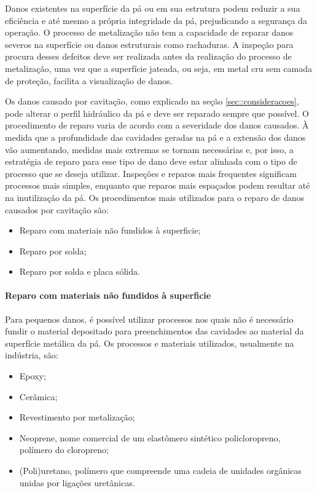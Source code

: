Danos existentes na superfície da pá ou em sua estrutura podem reduzir a sua
eficiência e até mesmo a própria integridade da pá, prejudicando a segurança 
da operação. O processo de metalização não tem a capacidade de reparar
danos severos na superfície ou danos estruturais como rachaduras. A inspeção
para procura desses defeitos deve ser realizada antes da realização do processo
de metalização, uma vez que a superfície jateada, ou seja, em metal cru sem
camada de proteção, facilita a visualização de danos. %

Os danos causado por cavitação, como explicado na seção
\ref{sec::consideracoes}, pode alterar o perfil hidráulico da pá e deve ser
reparado sempre que possível. O procedimento de reparo varia de acordo com a
severidade dos danos causados. À medida que a profundidade das cavidades geradas
na pá e a extensão dos danos vão aumentando, medidas mais extremas se tornam
necessárias e, por isso, a estratégia de reparo para esse tipo de dano deve
estar alinhada com o tipo de processo que se deseja utilizar. Inspeções e
reparos mais frequentes significam processos mais simples, enquanto que reparos
mais espaçados podem resultar até na inutilização da pá. Os procedimentos mais
utilizados para o reparo de danos causados por cavitação são:

\begin{itemize}
  \item Reparo com materiais não fundidos à superficie;
  \item Reparo por solda;
  \item Reparo por solda e placa sólida.
\end{itemize}

\paragraph{Reparo com materiais não fundidos à superficie}

Para pequenos danos, é possível utilizar processos nos quais não é necessário
fundir o material depositado para preenchimentos das cavidades ao material da
superfície metálica da pá. Os processos e materiais utilizados, usualmente na
indústria, são: 

\begin{itemize}
\item Epoxy;
\item Cerâmica;
\item Revestimento por metalização;
\item Neoprene, nome comercial de um elastômero sintético policloropreno,
polímero do cloropreno;
\item (Poli)uretano, polímero que compreende uma cadeia de unidades orgânicas
unidas por ligações uretânicas.
\end{itemize}

